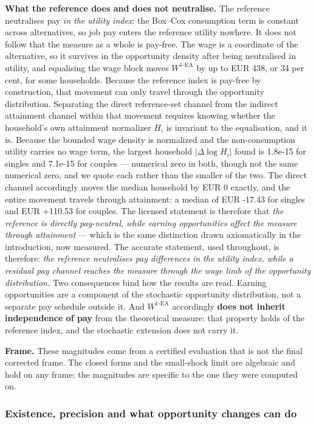 \documentclass[11pt,a4paper]{article}
\begin{document}
\textbf{What the reference does and does not neutralise.} The reference neutralises pay \emph{in the utility index}: the Box--Cox consumption term is constant across alternatives, so job pay enters the reference utility nowhere. It does not follow that the measure as a whole is pay-free. The wage is a coordinate of the alternative, so it survives in the opportunity density after being neutralised in utility, and equalising the wage block moves \(W^{1\text{-EA}}\) by up to EUR 438, or 34 per cent, for some households. Because the reference index is pay-free by construction, that movement can only travel through the opportunity distribution. Separating the direct reference-set channel from the indirect attainment channel within that movement requires knowing whether the household's own attainment normalizer \(H_i\) is invariant to the equalisation, and it is. Because the bounded wage density is normalized and the non-consumption utility carries no wage term, the largest household \(|\Delta\log H_i|\) found is 1.8e-15 for singles and 7.1e-15 for couples --- numerical zero in both, though not the same numerical zero, and we quote each rather than the smaller of the two. The direct channel accordingly moves the median household by EUR 0 exactly, and the entire movement travels through attainment: a median of EUR -17.43 for singles and EUR +110.53 for couples. The licensed statement is therefore that \emph{the reference is directly pay-neutral, while earning opportunities affect the measure through attainment} --- which is the same distinction drawn axiomatically in the introduction, now measured. The accurate statement, used throughout, is therefore: \emph{the reference neutralises pay differences in the utility index, while a residual pay channel reaches the measure through the wage limb of the opportunity distribution.} Two consequences bind how the results are read. Earning opportunities are a component of the stochastic opportunity distribution, not a separate pay schedule outside it. And \(W^{1\text{-EA}}\) accordingly \textbf{does not inherit independence of pay} from the theoretical measure: that property holds of the reference index, and the stochastic extension does not carry it.

\textbf{Frame.} These magnitudes come from a certified evaluation that is not the final corrected frame. The closed forms and the small-shock limit are algebraic and hold on any frame; the magnitudes are specific to the one they were computed on.

\subsubsection{Existence, precision and what opportunity changes can do}\label{existence-precision-and-what-opportunity-changes-can-do}
\end{document}
